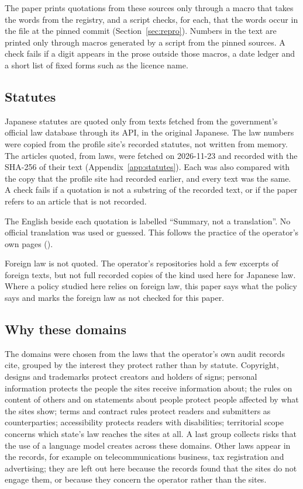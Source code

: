 \documentclass[11pt]{article}
\newcommand{\ev}[1]{\directlua{ev("\luaescapestring{#1}")}}
\newcommand{\citeev}[1]{(\ev{#1})}
\begin{document}
The paper prints quotations from these sources only through a macro that takes the words from the registry, and a script checks, for each, that the words occur in the file at the pinned commit (Section~\ref{sec:repro}). Numbers in the text are printed only through macros generated by a script from the pinned sources. A check fails if a digit appears in the prose outside those macros, a date ledger and a short list of fixed forms such as the licence name.

\subsection{Statutes}

Japanese statutes are quoted only from texts fetched from the government's official law database through its API, in the original Japanese. The law numbers were copied from the profile site's recorded statutes, not written from memory. The \nStatArticles{} articles quoted, from \nStatLaws{} laws, were fetched on 2026-11-23 and recorded with the SHA-256 of their text (Appendix~\ref{app:statutes}). Each was also compared with the copy that the profile site had recorded earlier, and every text was the same. A check fails if a quotation is not a substring of the recorded text, or if the paper refers to an article that is not recorded.

The English beside each quotation is labelled ``Summary, not a translation''. No official translation was used or guessed. This follows the practice of the operator's own pages \citeev{dl-summary}.

Foreign law is not quoted. The operator's repositories hold a few excerpts of foreign texts, but not full recorded copies of the kind used here for Japanese law. Where a policy studied here relies on foreign law, this paper says what the policy says and marks the foreign law as not checked for this paper.

\subsection{Why these domains}

The domains were chosen from the laws that the operator's own audit records cite, grouped by the interest they protect rather than by statute. Copyright, designs and trademarks protect creators and holders of signs; personal information protects the people the sites receive information about; the rules on content of others and on statements about people protect people affected by what the sites show; terms and contract rules protect readers and submitters as counterparties; accessibility protects readers with disabilities; territorial scope concerns which state's law reaches the sites at all. A last group collects risks that the use of a language model creates across these domains. Other laws appear in the records, for example on telecommunications business, tax registration and advertising; they are left out here because the records found that the sites do not engage them, or because they concern the operator rather than the sites.
\end{document}
